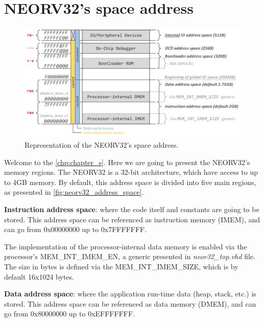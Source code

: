 \chapter{NEORV32's space address} \label{chp:chapter_s}

    \begin{figure}[!ht]
        \begin{center}
            \includegraphics[width=\textwidth]{figures/address_space.png}
            \caption{\label{fig:neorv32_address_space} Representation of the NEORV32's space address.}
        \end{center}
    \end{figure}

    Welcome to the \autoref{chp:chapter_s}. Here we are going to present the NEORV32's memory regions. The NEORV32 is a 32-bit architecture, which have access to up to 4GB memory. By default, this address space is divided into five main regions, as presented in \autoref{fig:neorv32_address_space}.

    \textbf{Instruction address space}: where the code itself and constants are going to be stored. This address space can be referenced as instruction memory (IMEM), and can go from 0x00000000 up to 0x7FFFFFFF.

        \begin{tcolorbox}[colback=blue!5!white,colframe=blue!75!black,title=Extra information]
            The implementation of the processor-internal data memory is enabled via the processor's MEM\_INT\_IMEM\_EN, a generic presented in \textit{neor32\_top.vhd} file. The size in bytes is defined via the MEM\_INT\_IMEM\_SIZE, which is by default 16x1024 bytes.
        \end{tcolorbox}

    \textbf{Data address space}: where the application run-time data (heap, stack, etc.) is stored. This address space can be referenced as data memory (DMEM), and can go from 0x80000000 up to 0xEFFFFFFF.

